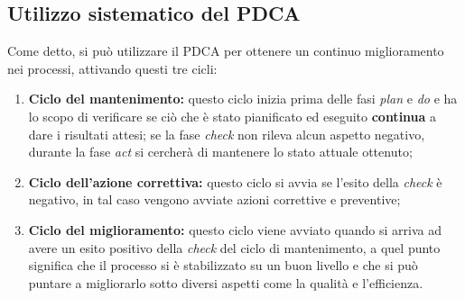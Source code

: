 \subsection{Utilizzo sistematico del PDCA}
Come detto, si può utilizzare il PDCA per ottenere un continuo miglioramento nei processi, attivando questi tre cicli:
\begin{enumerate}
	\item{\bf Ciclo del mantenimento:} questo ciclo inizia prima delle fasi \emph{plan} e \emph{do} e ha lo scopo di verificare se ciò che è stato pianificato ed eseguito \textbf{continua} a dare i risultati attesi; se la fase \emph{check} non rileva alcun aspetto negativo, durante la fase \emph{act} si cercherà di mantenere lo stato attuale ottenuto;
	\item{\bf Ciclo dell'azione correttiva:} questo ciclo si avvia se l'esito della \emph{check} è negativo, in tal caso vengono avviate azioni correttive e preventive;
	\item{\bf Ciclo del miglioramento:} questo ciclo viene avviato quando si arriva ad avere un esito positivo della \emph{check} del ciclo di mantenimento, a quel punto significa che il processo si è stabilizzato su un buon livello e che si può puntare a migliorarlo sotto diversi aspetti come la qualità e l'efficienza.
\end{enumerate}
